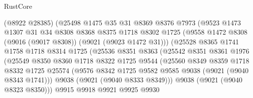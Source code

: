 \begin{lexlean}{RustCore}
\begin{coremodule}
                        (@8922 @28385)
                        (@25498
                          @1475
                          @35
                          @31
                          @8369
                          @8376
                          @7973
                          (@9523
                            @1473
                            @1307
                            @31
                            @34
                            @8308
                            @8368
                            @8375
                            @1718
                            @8302
                            @1725
                            (@9558 @1472 @8308 (@9016 (@9017 @8308)) (@9021 (@9023 @1472 @31)))
                            (@25528
                              @8365
                              @1741
                              @1758
                              @1718
                              @8314
                              @1725
                              (@25536
                                @8351
                                @8363
                                (@25542
                                  @8351
                                  @8361
                                  @1976
                                  (@25549
                                    @8350
                                    @8360
                                    @1718
                                    @8322
                                    @1725
                                    @9544
                                    (@25560
                                      @8349
                                      @8359
                                      @1718
                                      @8332
                                      @1725
                                      @25574
                                      (@9576
                                        @8342
                                        @1725
                                        @9582
                                        @9585
                                        @9038
                                        (@9021 (@9040 @8343 @1741)))
                                      @9038
                                      (@9021 (@9040 @8333 @8349)))
                                    @9038
                                    (@9021 (@9040 @8323 @8350)))
                                  @9915
                                  @9918
                                  @9921
                                  @9925
                                  @9930

\end{coremodule}
\end{lexlean}
